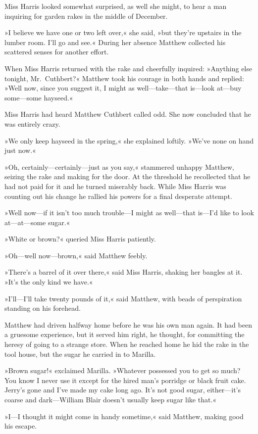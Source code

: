 Miss Harris looked somewhat surprised, as well she might, to hear a man inquiring for garden rakes in the middle of December.

»I believe we have one or two left over,« she said, »but they're upstairs in the lumber room. I'll go and see.« During her absence Matthew collected his scattered senses for another effort.

When Miss Harris returned with the rake and cheerfully inquired: »Anything else tonight, Mr.~Cuthbert?« Matthew took his courage in both hands and replied: »Well now, since you suggest it, I might as well—take—that is—look at—buy some—some hayseed.«

Miss Harris had heard Matthew Cuthbert called odd. She now concluded that he was entirely crazy.

»We only keep hayseed in the spring,« she explained loftily. »We've none on hand just now.«

»Oh, certainly—certainly—just as you say,« stammered unhappy Matthew, seizing the rake and making for the door. At the threshold he recollected that he had not paid for it and he turned miserably back. While Miss Harris was counting out his change he rallied his powers for a final desperate attempt.

»Well now—if it isn't too much trouble—I might as well—that is—I'd like to look at—at—some sugar.«

»White or brown?« queried Miss Harris patiently.

»Oh—well now—brown,« said Matthew feebly.

»There's a barrel of it over there,« said Miss Harris, shaking her bangles at it. »It's the only kind we have.«

»I'll—I'll take twenty pounds of it,« said Matthew, with beads of perspiration standing on his forehead.

Matthew had driven halfway home before he was his own man again. It had been a gruesome experience, but it served him right, he thought, for committing the heresy of going to a strange store. When he reached home he hid the rake in the tool house, but the sugar he carried in to Marilla.

»Brown sugar!« exclaimed Marilla. »Whatever possessed you to get so much? You know I never use it except for the hired man's porridge or black fruit cake. Jerry's gone and I've made my cake long ago. It's not good sugar, either—it's coarse and dark—William Blair doesn't usually keep sugar like that.«

»I—I thought it might come in handy sometime,« said Matthew, making good his escape.


